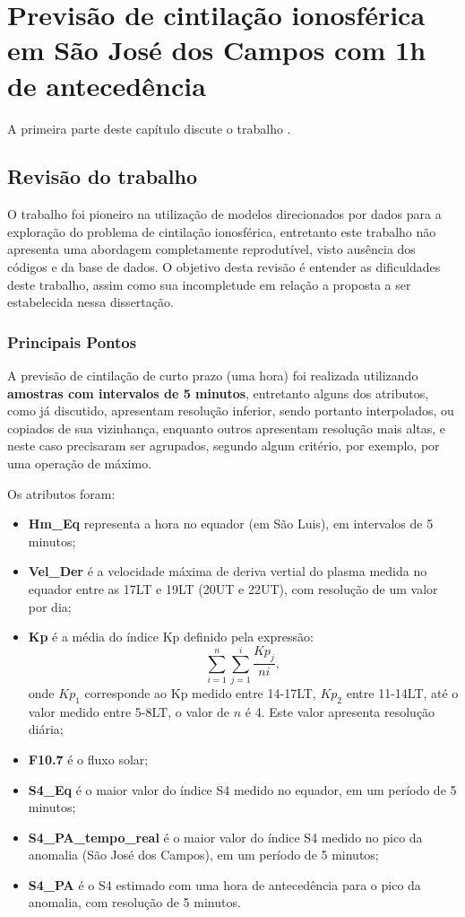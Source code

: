 \chapter{Previsão de cintilação ionosférica em São José dos Campos com 1h de antecedência}\label{ch:revisonrezende}

A primeira parte deste capítulo discute o trabalho \cite{REZENDE:2009}.

\section{Revisão do trabalho \cite{REZENDE:2009}}

O trabalho \cite{REZENDE:2009} foi pioneiro na utilização de modelos direcionados por dados para a exploração do problema de cintilação ionosférica, entretanto este trabalho não apresenta uma abordagem completamente reprodutível, visto ausência dos códigos e da base de dados. O objetivo desta revisão é entender as dificuldades deste trabalho, assim como sua incompletude em relação a proposta a ser estabelecida nessa dissertação.

\subsection{Principais Pontos}

A previsão de cintilação de curto prazo (uma hora) foi realizada utilizando {\bf amostras com intervalos de 5 minutos}, entretanto alguns dos atributos, como já discutido, apresentam resolução inferior, sendo portanto interpolados, ou copiados de sua vizinhança, enquanto outros apresentam resolução mais altas, e neste caso precisaram ser agrupados, segundo algum critério, por exemplo, por uma operação de máximo.

Os atributos foram:

\begin{itemize}
\item {\bf Hm\_Eq} representa a hora no equador (em São Luis), em intervalos de 5 minutos;
\item {\bf Vel\_Der} é a velocidade máxima de deriva vertial do plasma medida no equador entre as 17LT e 19LT (20UT e 22UT), com resolução de um valor por dia;
\item {\bf Kp} é a média do índice Kp definido pela expressão:
\begin{equation}
\sum_{i=1}^{n}\sum_{j=1}^{i}\frac{Kp_{j}}{ni}\mbox{,}~
\end{equation}
onde $Kp_1$ corresponde ao Kp medido entre 14-17LT, $Kp_2$ entre 11-14LT, até o valor medido entre 5-8LT, o valor de $n$ é 4. Este valor apresenta resolução diária;
\item {\bf F10.7} é o fluxo solar;
\item {\bf S4\_Eq} é o maior valor do índice S4 medido no equador, em um período de 5 minutos;
\item {\bf S4\_PA\_tempo\_real} é o maior valor do índice S4 medido no pico da anomalia (São José dos Campos), em um período de 5 minutos;
\item {\bf S4\_PA} é o S4 estimado com uma hora de antecedência para o pico da anomalia, com resolução de 5 minutos.
\end{itemize}

